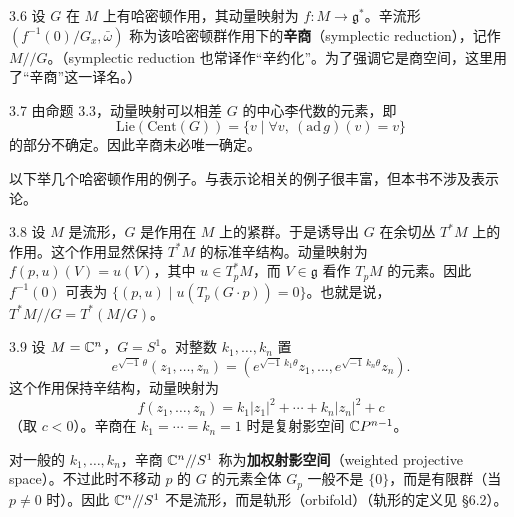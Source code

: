\begin{definition}{3.6}
  设 $G$ 在 $M$ 上有哈密顿作用，其动量映射为 $f\colon M\to\mathfrak{g}^*$。辛流形 $(f^{-1}(0)/G_x,\bar\omega)$ 称为该哈密顿群作用下的\textbf{辛商}（symplectic reduction），记作 $M/\!/G$。（symplectic reduction 也常译作“辛约化”。为了强调它是商空间，这里用了“辛商”这一译名。）
\end{definition}


\begin{remark}{3.7}
  由命题 3.3，动量映射可以相差 $G$ 的中心李代数的元素，即
  \[
    \mathrm{Lie}(\mathrm{Cent}(G))=\{v\mid\forall v,\ (\mathrm{ad}\,g)(v)=v\}
  \]
  的部分不确定。因此辛商未必唯一确定。
\end{remark}


以下举几个哈密顿作用的例子。与表示论相关的例子很丰富，但本书不涉及表示论。

\begin{example}{3.8}
  设 $M$ 是流形，$G$ 是作用在 $M$ 上的紧群。于是诱导出 $G$ 在余切丛 $T^*M$ 上的作用。这个作用显然保持 $T^*M$ 的标准辛结构。动量映射为 $f(p,u)(V)=u(V)$，其中 $u\in T_p^*M$，而 $V\in\mathfrak{g}$ 看作 $T_pM$ 的元素。因此 $f^{-1}(0)$ 可表为 $\{(p,u)\mid u(T_p(G\cdot p))=0\}$。也就是说，$T^*M/\!/G=T^*(M/G)$。
\end{example}

\begin{example}{3.9}
  设 $M=\mathbb{C}^n$，$G=S^1$。对整数 $k_1,\dots,k_n$ 置
  \[
    e^{\sqrt{-1}\,\theta}(z_1,\dots,z_n)=(e^{\sqrt{-1}\,k_1\theta}z_1,\dots,e^{\sqrt{-1}\,k_n\theta}z_n).
  \]
  这个作用保持辛结构，动量映射为
  \[
    f(z_1,\dots,z_n)=k_1|z_1|^2+\cdots+k_n|z_n|^2+c
  \]
  （取 $c<0$）。辛商在 $k_1=\cdots=k_n=1$ 时是复射影空间 $\mathbb{C}P^{n-1}$。

  对一般的 $k_1,\dots,k_n$，辛商 $\mathbb{C}^n/\!/S^1$ 称为\textbf{加权射影空间}（weighted projective space）。不过此时不移动 $p$ 的 $G$ 的元素全体 $G_p$ 一般不是 $\{0\}$，而是有限群（当 $p\neq0$ 时）。因此 $\mathbb{C}^n/\!/S^1$ 不是流形，而是轨形（orbifold）（轨形的定义见 §6.2）。
\end{example}

